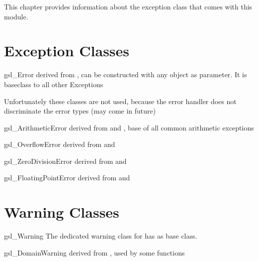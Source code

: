
This chapter provides information about the  exception class that comes with this module.

\section{Exception Classes}

\begin{excclassdesc} {gsl_Error}{}
derived from , can be constructed with any object as parameter.
It is baseclass to all other \gsl{} Exceptions
\end{excclassdesc}

Unfortunately these classes are not used, because the error handler does not discriminate the error types (may come in future)

\begin{excclassdesc}{gsl\_ArithmeticError}{}
derived from  and ,
base of all common arithmetic exceptions
\end{excclassdesc}

\begin{excclassdesc}{gsl_OverflowError}{}
derived from  and 
\end{excclassdesc}

\begin{excclassdesc}{gsl\_ZeroDivisionError}{}
derived from  and 
\end{excclassdesc}

\begin{excclassdesc}{gsl\_FloatingPointError}{}
derived from  and 
\end{excclassdesc}

\section{Warning Classes}

\begin{excclassdesc} {gsl_Warning}{}
The dedicated warning class for \gsl{} has  as base class.
\end{excclassdesc}

\begin{excclassdesc}{gsl\_DomainWarning}{}
derived from , used by some  functions
\end{excclassdesc}

